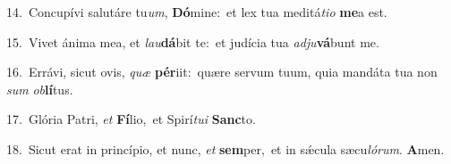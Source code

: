 {\numbfont\textcolor{\numbcolor}{14.}}~Concupívi salutáre tu\-\textit{um}\-, \textbf{Dó}\-mine:~\star et lex tua meditá\-\textit{ti}\-\textit{o} \textbf{me}\-a est.\par
{\numbfont\textcolor{\numbcolor}{15.}}~Vivet ánima mea, et \textit{lau}\-\textbf{dá}bit te:~\star et judícia tua \textit{ad}\-\textit{ju}\textbf{vá}bunt me.\par
{\numbfont\textcolor{\numbcolor}{16.}}~Errávi, sicut ovis, \textit{quæ} \textbf{pér}\-iit:~\star quære servum tuum, quia mandáta tua non \textit{sum} \textit{ob}\-\textbf{lí}tus.\par
{\numbfont\textcolor{\numbcolor}{17.}}~Glória Patri, \textit{et} \textbf{Fí}\-lio,~\star et Spirí\-\textit{tu}\-\textit{i} \textbf{Sanc}\-to.\par
{\numbfont\textcolor{\numbcolor}{18.}}~Sicut erat in princípio, et nunc, \textit{et} \textbf{sem}\-per,~\star et in sǽcula sæcu\-\textit{ló}\-\textit{rum}. \textbf{A}\-men.\par
